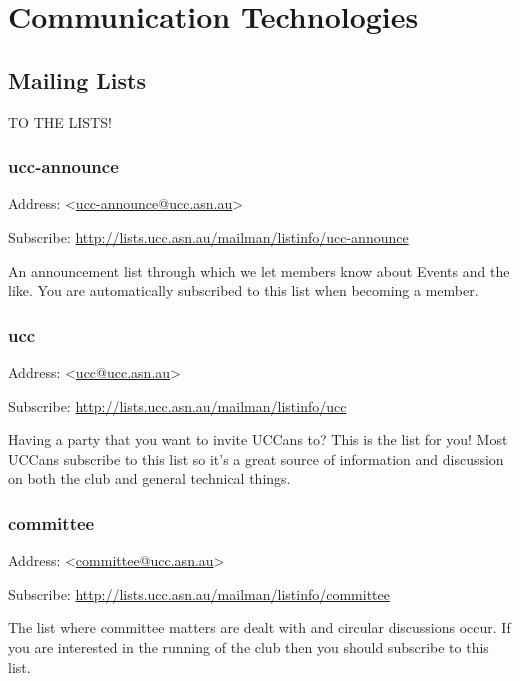 \chapter{Communication Technologies}\label{Communications}


\newenvironment{ucclist}[1]
{
	\begin{mdframed}[nobreak=true]
	\subsection{#1}
	\begin{mdframed}
		Address:  <\href{mailto:#1@ucc.asn.au}{#1@ucc.asn.au}>
	\end{mdframed}
	\begin{mdframed}
		Subscribe:  \small{\url{http://lists.ucc.asn.au/mailman/listinfo/#1}}
	\end{mdframed}


	
}{\end{mdframed}}

\section{Mailing Lists}

\textsc{TO THE LISTS!}
\begin{ucclist}{ucc-announce}

An announcement list through which we let 
members know about Events and the like. You are automatically 
subscribed to this list when becoming a member. 

\end{ucclist}

\begin{ucclist}{ucc}

Having a party that you want to invite UCCans to? This is the 
list for you! Most UCCans subscribe to this list so it's a great 
source of information and discussion on both the club and general 
technical things. 

\end{ucclist}

\pagebreak

\begin{ucclist}{committee}
The list where committee matters are dealt with and circular 
discussions occur. If you are interested in the running of the club then 
you should subscribe to this list. 
\end{ucclist}

